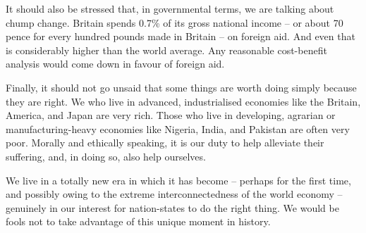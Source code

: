    It should also be stressed that, in governmental terms, we are talking
   about chump change. Britain spends 0.7\% of its gross national income --
   or about 70 pence for every hundred pounds made in Britain -- on
   foreign aid. And even that is considerably higher than the world
   average. Any reasonable cost-benefit analysis would come down in favour
   of foreign aid.

   Finally, it should not go unsaid that some things are worth doing
   simply because they are right. We who live in advanced, industrialised
   economies like the Britain, America, and Japan are very rich. Those who
   live in developing, agrarian or manufacturing-heavy economies like
   Nigeria, India, and Pakistan are often very poor. Morally and ethically
   speaking, it is our duty to help alleviate their suffering, and, in
   doing so, also help ourselves.

   We live in a totally new era in which it has become -- perhaps for the
   first time, and possibly owing to the extreme interconnectedness of the
   world economy -- genuinely in our interest for nation-states to do the
   right thing. We would be fools not to take advantage of this unique
   moment in history.

%
%
%
%
%
%
